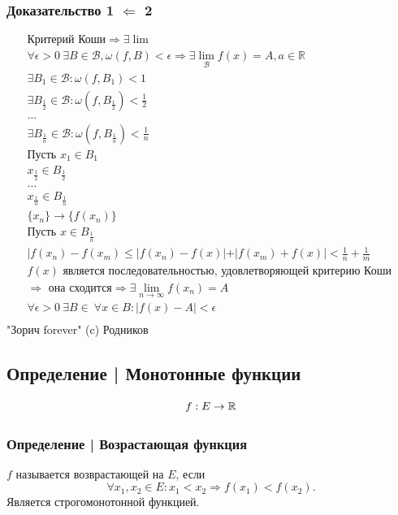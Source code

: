 \documentclass{article}
\begin{document}
\subsubsection{Доказательство 1 $\Leftarrow$ 2}
\begin{gather*}
    \text{Критерий Коши} \Rightarrow \exists \lim \\
    \forall \epsilon > 0 ~ \exists B \in \mathcal{B}, \omega(f, B) < \epsilon \Rightarrow
    \exists \lim_{\mathcal{B}} f(x) = A, a \in \mathbb{R} \\
    \exists B_1 \in \mathcal{B}: \omega(f, B_1) < 1 \\
    \exists B_\frac{1}{2} \in \mathcal{B}: \omega(f, B_{\frac{1}{2}}) < \frac{1}{2} \\
    \dots \\
    \exists B_\frac{1}{n} \in \mathcal{B}: \omega(f, B_{\frac{1}{n}}) < \frac{1}{n} \\
    \text{Пусть } x_1 \in B_1 \\
    x_{\frac{1}{2}} \in B_{\frac{1}{2}} \\
    \dots \\
    x_{\frac{1}{n}} \in B_{\frac{1}{n}} \\
    \{x_n\} \rightarrow \{f(x_n)\} \\
    \text{Пусть } x \in B_{\frac{1}{n}} \\
    |f(x_n) - f(x_m) \le |f(x_n) - f(x)| + |f(x_m) + f(x)| < \frac{1}{n} + \frac{1}{m} \\
    f(x) \text{ является последовательностью, удовлетворяющей критерию Коши } \\
    \Rightarrow \text{ она сходится} \Rightarrow
    \exists \lim_{n \to \infty} f(x_n) = A \\
    \forall \epsilon > 0 ~ \exists B \in \mathcal ~ \forall x \in B: |f(x) - A| < \epsilon \\
\end{gather*}
"Зорич forever" (c) Родников


\subsection{Определение | Монотонные функции}
\[
    f: E \rightarrow \mathbb{R} \\
\]

\subsubsection{Определение | Возрастающая функция}
$f$ называется возврастающей на $E$, если
\[
\forall x_1, x_2 \in E: x_1 < x_2 \Rightarrow f(x_1) < f(x_2).
\]
Является строгомонотонной функцией.
\end{document}
